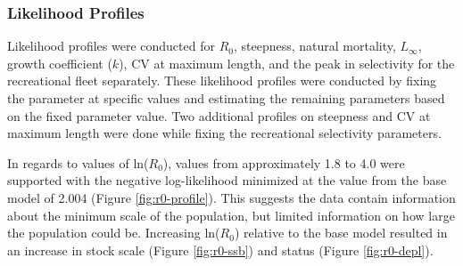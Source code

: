 \documentclass[11pt,
  english,
  a4paper,
]{article}
\begin{document}
\leavevmode\tagmcend\tagstructend\par


\hypertarget{likelihood-profiles}{%
\subsubsection{Likelihood Profiles}\label{likelihood-profiles}}

\leavevmode\tagmcend\tagstructend


Likelihood profiles were conducted for {\(R_0\)\leavevmode\tagmcend\tagstructend}, steepness, natural mortality, {\(L_{\infty}\)\leavevmode\tagmcend\tagstructend}, growth coefficient ({\(k\)\leavevmode\tagmcend\tagstructend}), CV at maximum length, and the peak in selectivity for the recreational fleet separately. These likelihood profiles were conducted by fixing the parameter at specific values and estimating the remaining parameters based on the fixed parameter value. Two additional profiles on steepness and CV at maximum length were done while fixing the recreational selectivity parameters.

\leavevmode\tagmcend\tagstructend\par


In regards to values of ln({\(R_0\)\leavevmode\tagmcend\tagstructend}), values from approximately 1.8 to 4.0 were supported with the negative log-likelihood minimized at the value from the base model of 2.004 (Figure \ref{fig:r0-profile}). This suggests the data contain information about the minimum scale of the population, but limited information on how large the population could be. Increasing ln({\(R_0\)\leavevmode\tagmcend\tagstructend}) relative to the base model resulted in an increase in stock scale (Figure \ref{fig:r0-ssb}) and status (Figure \ref{fig:r0-depl}).

\leavevmode\tagmcend\tagstructend\par

\end{document}
